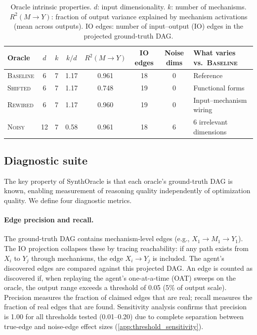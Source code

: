 \documentclass[11pt,letterpaper]{article}
\newcommand{\oracle}[1]{\textsc{#1}}
\newcommand{\baseline}{\oracle{Baseline}}
\newcommand{\shifted}{\oracle{Shifted}}
\newcommand{\rewired}{\oracle{Rewired}}
\newcommand{\noisy}{\oracle{Noisy}}
\begin{document}
\begin{table}[t]
\centering
\caption{Oracle intrinsic properties. $d$: input dimensionality.
$k$: number of mechanisms. $R^2(M \!\to\! Y)$: fraction of output
variance explained by mechanism activations (mean across outputs).
IO edges: number of input--output (IO) edges in the projected
ground-truth DAG.}
\label{tab:oracle_properties}
\small
\begin{tabular}{@{}lccccccl@{}}
\toprule
Oracle & $d$ & $k$ & $k/d$ & $R^2(M\!\to\!Y)$ & IO edges & Noise dims
  & What varies vs.\ \baseline{} \\
\midrule
\baseline{} & 6 & 7 & 1.17 & 0.961 & 18 & 0 & Reference \\
\shifted{}  & 6 & 7 & 1.17 & 0.748 & 19 & 0 & Functional forms \\
\rewired{}  & 6 & 7 & 1.17 & 0.960 & 19 & 0 & Input--mechanism wiring \\
\noisy{}    & 12 & 7 & 0.58 & 0.961 & 18 & 6 & 6 irrelevant dimensions \\
\bottomrule
\end{tabular}
\end{table}

\subsection{Diagnostic suite}
\label{sec:diagnostics}

The key property of SynthOracle is that each oracle's ground-truth DAG
is known, enabling measurement of reasoning quality independently of
optimization quality. We define four diagnostic metrics.

\paragraph{Edge precision and recall.} The ground-truth DAG contains
mechanism-level edges (e.g., $X_1 \!\to\! M_1 \!\to\! Y_1$). The
IO projection collapses these by tracing reachability:
if any path exists from $X_i$ to $Y_j$ through mechanisms, the edge
$X_i \!\to\! Y_j$ is included. The agent's discovered edges are
compared against this projected DAG. An edge is counted as discovered if, when replaying the
agent's one-at-a-time (OAT) sweeps on the oracle, the output range
exceeds a threshold of 0.05 (5\% of output scale). Precision measures
the fraction of claimed edges that are real; recall measures the fraction
of real edges that are found. Sensitivity analysis confirms that
precision is 1.00 for all thresholds tested (0.01--0.20) due to complete
separation between true-edge and noise-edge effect sizes
(\cref{app:threshold_sensitivity}).
\end{document}
